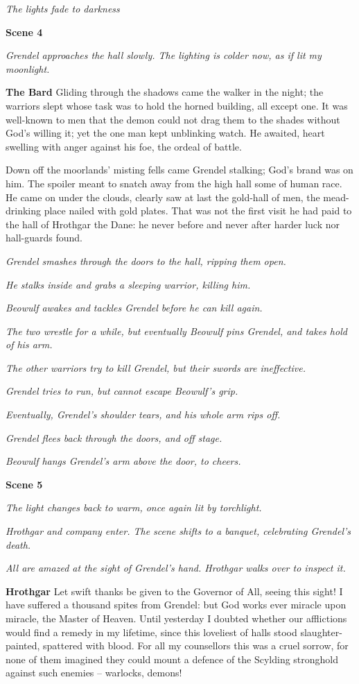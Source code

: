 \documentclass[a4paper]{article}
\begin{document}
{\centerline{\textit{The lights fade to darkness}}

\centerline{\textbf{Scene 4}}
\centerline{\textit{Grendel approaches the hall slowly. The lighting is colder now, as if lit my moonlight.}}

\textbf{The Bard} Gliding through the shadows came
the walker in the night; the warriors slept
whose task was to hold the horned building,
all except one. It was well-known to men
that the demon could not drag them to the shades
without God’s willing it; yet the one man kept
unblinking watch. He awaited, heart swelling
with anger against his foe, the ordeal of battle.

Down off the moorlands’ misting fells came
Grendel stalking; God’s brand was on him.
The spoiler meant to snatch away
from the high hall some of human race.
He came on under the clouds, clearly saw at last
the gold-hall of men, the mead-drinking place
nailed with gold plates. That was not the first visit
he had paid to the hall of Hrothgar the Dane:
he never before and never after
harder luck nor hall-guards found.

\centerline{\textit{Grendel smashes through the doors to the hall, ripping them open.}}
\centerline{\textit{He stalks inside and grabs a sleeping warrior, killing him.}}
\centerline{\textit{Beowulf awakes and tackles Grendel before he can kill again.}}
\centerline{\textit{The two wrestle for a while, but eventually Beowulf pins Grendel, and takes hold of his arm.}}
\centerline{\textit{The other warriors try to kill Grendel, but their swords are ineffective.}}
\centerline{\textit{Grendel tries to run, but cannot escape Beowulf's grip.}}
\centerline{\textit{Eventually, Grendel's shoulder tears, and his whole arm rips off.}}
\centerline{\textit{Grendel flees back through the doors, and off stage.}}
\centerline{\textit{Beowulf hangs Grendel's arm above the door, to cheers.}}

\centerline{\textbf{Scene 5}}
\centerline{\textit{The light changes back to warm, once again lit by torchlight.}}
\centerline{\textit{Hrothgar and company enter. The scene shifts to a banquet, celebrating Grendel's death.}}
\centerline{\textit{All are amazed at the sight of Grendel's hand. Hrothgar walks over to inspect it.}}

\textbf{Hrothgar} Let swift thanks be given to the Governor of All,
seeing this sight! I have suffered a thousand
spites from Grendel: but God works ever
miracle upon miracle, the Master of Heaven.
Until yesterday I doubted whether
our afflictions would find a remedy
in my lifetime, since this loveliest of halls
stood slaughter-painted, spattered with blood.
For all my counsellors this was a cruel sorrow,
for none of them imagined they could mount a defence
of the Scylding stronghold against such enemies –
warlocks, demons!

}
\end{document}
